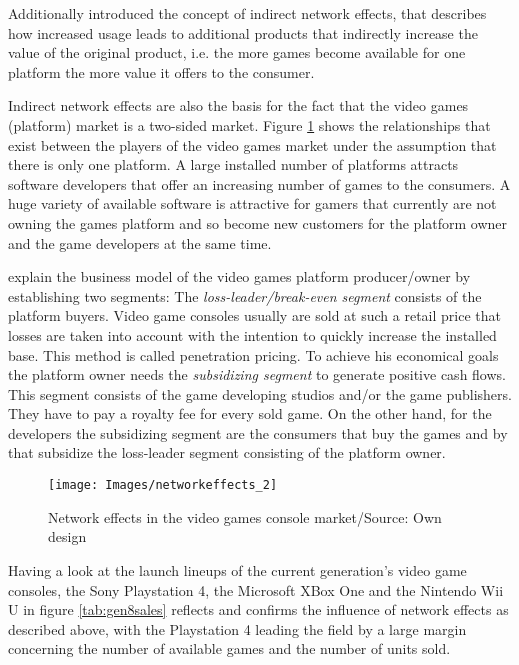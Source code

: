 \documentclass
[
    a4paper,
    11pt
]
{article}
\begin{document}
Additionally \cite{Economides1992} introduced the concept of indirect network
effects, that describes how increased usage leads to additional products that
indirectly increase the value of the original product, i.e. the more games
become available for one platform the more value it offers to the consumer.

Indirect network effects are also the basis for the fact that the video games
(platform) market is a two-sided market. \cite{Rochet2003} Figure \ref{fig:networkeffects}
shows the relationships that exist between the players of the video games market under
the assumption that there is only one platform. A large installed number of platforms
attracts software developers that offer an increasing number of games to the consumers.
A huge variety of available software is attractive for gamers that currently are not
owning the games platform and so become new customers for the platform owner and
the game developers at the same time.

\cite{Rochet2003} explain the business model of the video games platform producer/owner
by establishing two segments: The \emph{loss-leader/break-even segment} consists of the platform
buyers. Video game consoles usually are sold at such a retail price that losses are
taken into account with the intention to quickly increase the installed base. This
method is called penetration pricing. \cite{Liu2010} To achieve his economical goals
the platform owner needs the \emph{subsidizing segment} to generate positive cash flows. This segment consists
of the game developing studios and/or the game publishers. They have to pay a royalty fee
for every sold game. \cite{Rochet2003} On the other hand, for the developers the subsidizing
segment are the consumers that buy the games and by that subsidize the loss-leader segment
consisting of the platform owner.

\begin{figure}[ht!]
\centering
    \texttt{[image: Images/networkeffects\_2]}
    \caption{Network effects in the video games console market/Source: Own design}
    \label{fig:networkeffects}
\end{figure}

Having a look at the launch lineups of the current generation's video game consoles, the
Sony Playstation 4, the Microsoft XBox One and the Nintendo Wii U in figure \ref{tab:gen8sales}
reflects and confirms the influence of network effects as described above, with the Playstation 4
leading the field by a large margin concerning the number of available games and the number of units sold.
\end{document}
